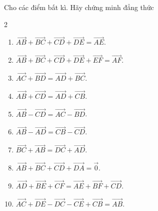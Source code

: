 \begin{bt}%
	Cho các điểm bất kì. Hãy chứng minh đẳng thức
	\begin{multicols}{2}
	\begin{enumerate}
		\item $\overrightarrow{AB}+\overrightarrow{BC}+\overrightarrow{CD}+\overrightarrow{DE}=\overrightarrow{AE}$.
		\item $\overrightarrow{AB}+\overrightarrow{BC}+\overrightarrow{CD}+\overrightarrow{DE}+\overrightarrow{EF}=\overrightarrow{AF}$.
		\item $\overrightarrow{AC}+\overrightarrow{BD}=\overrightarrow{AD}+\overrightarrow{BC}$.
		\item $\overrightarrow{AB}+\overrightarrow{CD}=\overrightarrow{AD}+\overrightarrow{CB}$.
		\item $\overrightarrow{AB}-\overrightarrow{CD}=\overrightarrow{AC}-\overrightarrow{BD}$.
		\item $\overrightarrow{AB}-\overrightarrow{AD}=\overrightarrow{CB}-\overrightarrow{CD}$.
		\item $\overrightarrow{BC}+\overrightarrow{AB}=\overrightarrow{DC}+\overrightarrow{AD}$.
		\item $\overrightarrow{AB}+\overrightarrow{BC}+\overrightarrow{CD}+\overrightarrow{DA}=\overrightarrow{0}$.
		\item $\overrightarrow{AD}+\overrightarrow{BE}+\overrightarrow{CF}=\overrightarrow{AE}+\overrightarrow{BF}+\overrightarrow{CD}$.
		\item $\overrightarrow{AC}+\overrightarrow{DE}-\overrightarrow{DC}-\overrightarrow{CE}+\overrightarrow{CB}=\overrightarrow{AB}$.
	\end{enumerate}
	\end{multicols}
\end{bt}

